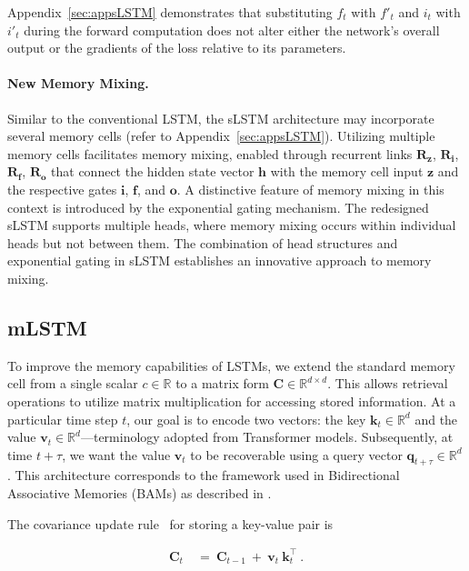 Appendix~\ref{sec:appsLSTM} demonstrates that substituting $f_t$ with $f'_t$ and $i_t$ with $i'_t$ during the forward computation does not alter either the network’s overall output or the gradients of the loss relative to its parameters.

\paragraph{New Memory Mixing.} Similar to the conventional LSTM, the sLSTM architecture may incorporate several memory cells (refer to Appendix~\ref{sec:appsLSTM}). Utilizing multiple memory cells facilitates memory mixing, enabled through recurrent links $\mathbf{R}_{\mathbf{z}}$, $\mathbf{R}_{\mathbf{i}}$, $\mathbf{R}_{\mathbf{f}}$, $\mathbf{R}_{\mathbf{o}}$ that connect the hidden state vector $\mathbf{h}$ with the memory cell input $\mathbf{z}$ and the respective gates $\mathbf{i}$, $\mathbf{f}$, and $\mathbf{o}$. A distinctive feature of memory mixing in this context is introduced by the exponential gating mechanism. The redesigned sLSTM supports multiple heads, where memory mixing occurs within individual heads but not between them. The combination of head structures and exponential gating in sLSTM establishes an innovative approach to memory mixing.

\subsection{mLSTM}
\label{sec:mLSTM}

To improve the memory capabilities of LSTMs, we extend the standard memory cell from a single scalar $c \in \mathbb{R}$ to a matrix form $\mathbf{C} \in \mathbb{R}^{d \times d}$. This allows retrieval operations to utilize matrix multiplication for accessing stored information. At a particular time step $t$, our goal is to encode two vectors: the key $\mathbf{k}_t \in \mathbb{R}^d$ and the value $\mathbf{v}_t \in \mathbb{R}^d$—terminology adopted from Transformer models. Subsequently, at time $t + \tau$, we want the value $\mathbf{v}_t$ to be recoverable using a query vector $\mathbf{q}_{t+\tau} \in \mathbb{R}^d$. This architecture corresponds to the framework used in Bidirectional Associative Memories (BAMs) as described in \citep{Kohonen:72,Anderson:72,Nakano:72,Anderson:77}.

The covariance update rule~\citep{Sejnowski:77,Dayan:91} for storing a key-value pair is

\begin{align}
\mathbf{C}_t \ &= \ \mathbf{C}_{t-1} \ + \ \mathbf{v}_{t} \ \mathbf{k}_t^\top \ .
\end{align}

